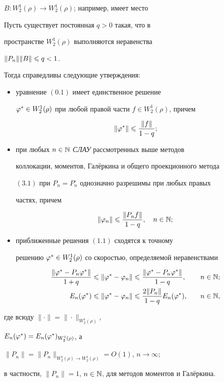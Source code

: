 $B:W_2^1(\rho)\to W_2^1(\rho)$; например, имеет место





\begin{thm}


Пусть существует постоянная $q>0$ такая, что в 


пространстве $W_2^1(\rho)$ выполняются неравенства


$\|P_n\|\|B\|\leqslant q < 1$.


Тогда справедливы следующие утверждения\/${:}$


\begin{itemize}


\item[а)] уравнение $(0.1)$ имеет единственное решение


$\varphi^*\in W_2^1(\rho)$ при любой правой части $f\in W_2^1(\rho)$, причем 


$$


\|\vp^*\|\lea \frac{\|f\|}{1-q};


$$


\item[б)] при любых $n\in \Bbb N$ {\em СЛАУ} рассмотренных выше методов  


коллокации, моментов, Гал\"еркина и общего проекционного метода


$(3.1)$ при $P_n=P_n^\circ$ однозначно разрешимы при любых правых 


частях, причем 


$$


\|\vp_n\|\lea \frac{\|P_n f\|}{1-q}, \quad n\in \N;


$$


\item[в)] приближенные решения $(1.1)$ сходятся к точному 


решению $\varphi^*\in W_2^1(\rho)$ со скоростью, определяемой неравенствами


\begin{alignat*}{2}


\frac{\|\vp^* - P_n\vp^*\|}{1+q}&\lea \|\vp^* - \vp_n\|\lea


\frac{\|\vp^* - P_n\vp^*\|}{1-q},&\quad n&\in \N;\\


%


E_n(\vp^*)&\lea \|\vp^*-\vp_n\|\lea \frac{2\|P_n\|}{1-q}E_n(\vp^*),


&\quad n&\in \N,


\end{alignat*}


\end{itemize}


где всюду $\|\cdot\| = \|\cdot\|_{W_2^1(\rho)}$,


$E_n(\varphi^*) = E_n(\varphi^*)_{W_2^1(\rho)}$, а


$\|P_n\|=\|P_n\|_{W_2^1(\rho)\to W_2^1(\rho)}=O(1)$, $n\to \infty$;


в частности, $\|P_n\|=1$, $n\in \Bbb N$, для методов моментов и Гал\"еркина.


\end{thm}








